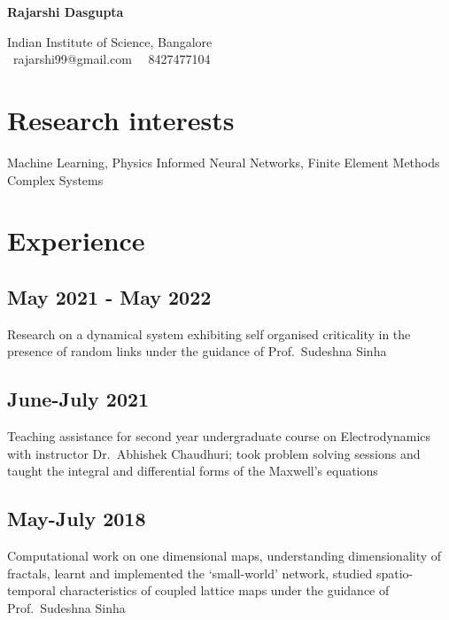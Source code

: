 \documentclass{article}
\newcommand{\theauthor}{Rajarshi Dasgupta}
\begin{document}
\begin{center}
	{\bf \huge \theauthor}

	\vspace{1em}

	Indian Institute of Science, Bangalore\\
	\Letter \, rajarshi99@gmail.com \,
	\faMobilePhone \, 8427477104
\end{center}

\section{Research interests}

Machine Learning,
Physics Informed Neural Networks,
Finite Element Methods
Complex Systems

\section{Experience}

\subsection{May 2021 - May 2022}
Research on a dynamical system
exhibiting self organised criticality
in the presence of random links
under the guidance of Prof.~Sudeshna Sinha

\subsection{June-July 2021}
Teaching assistance
for second year undergraduate course
on Electrodynamics
with instructor Dr.~Abhishek Chaudhuri;
took problem solving sessions
and taught the integral and differential forms
of the Maxwell's equations


\subsection{May-July 2018}

Computational work on one dimensional maps,
understanding dimensionality of fractals,
learnt and implemented the `small-world' network,
studied spatio-temporal characteristics
of coupled lattice maps
under the guidance of Prof.~Sudeshna Sinha
\end{document}

